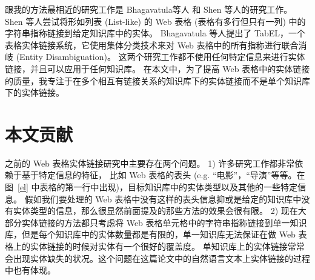 跟我的方法最相近的研究工作是 Bhagavatula等人\cite{bhagavatula2015tabel} 和 Shen 等人\cite{shen2012liege}的研究工作。
Shen 等人\cite{shen2012liege}尝试将形如列表 (List-like) 的 Web 表格 (表格有多行但只有一列) 中的字符串指称链接到给定知识库中的实体。
Bhagavatula 等人\cite{bhagavatula2015tabel}提出了 TabEL，一个表格实体链接系统，它使用集体分类技术来对 Web 表格中的所有指称进行联合消岐 (Entity Disambiguation)。
这两个研究工作都不使用任何特定信息来进行实体链接，并且可以应用于任何知识库。
在本文中，为了提高 Web 表格中的实体链接的质量，我专注于在多个相互有链接关系的知识库下的实体链接而不是单个知识库下的实体链接。\par


\section{本文贡献}\label{contribution}

之前的 Web 表格实体链接研究中主要存在两个问题。
1) 许多研究工作\cite{limaye2010annotating}\cite{hignette2009fuzzy}\cite{mulwad2013semantic}\cite{syed2010exploiting}\cite{zhang2014towards}\cite{zhang2014learning}都非常依赖于基于特定信息的特征，
比如 Web 表格的表头 (e.g. ``电影''，``导演''等等。在图~\ref{el} 中表格的第一行中出现)，目标知识库中的实体类型以及其他的一些特定信息。
假如我们要处理的 Web 表格中没有这样的表头信息抑或是给定的知识库中没有实体类型的信息，那么很显然前面提及的那些方法的效果会很有限。
2) 现在大部分实体链接的方法\cite{limaye2010annotating}\cite{hignette2009fuzzy}\cite{syed2010exploiting}\cite{zhang2014towards}\cite{zhang2014learning}\cite{shen2012liege}\cite{bhagavatula2015tabel}都只考虑将 Web 表格单元格中的字符串指称链接到单一知识库，但是每个知识库中的实体数量都是有限的，单一知识库无法保证在做 Web 表格上的实体链接的时候对实体有一个很好的覆盖度。
单知识库上的实体链接常常会出现实体缺失的状况。这个问题在这篇论文\cite{pereira2014entity}中的自然语言文本上实体链接的过程中也有体现。\par

